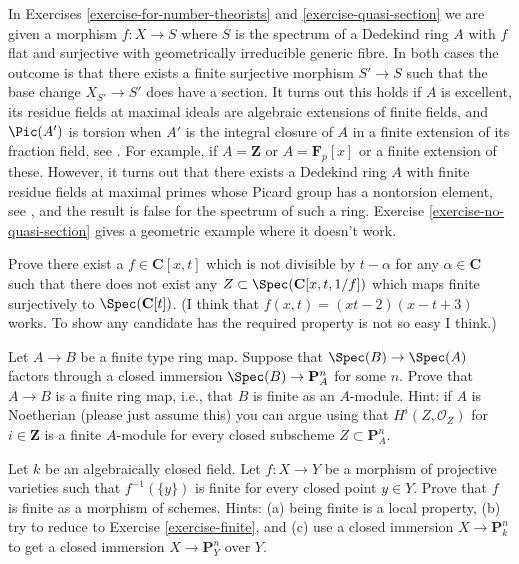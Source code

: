 \begin{remark}
\label{remark-interpretation-skolem-noether}
In Exercises \ref{exercise-for-number-theorists} and
\ref{exercise-quasi-section} we are given a morphism $f : X \to S$
where $S$ is the spectrum of a Dedekind ring $A$ with $f$ flat and
surjective with geometrically irreducible generic fibre. In both cases
the outcome is that there exists a finite surjective morphism $S' \to S$
such that the base change $X_{S'} \to S'$ does have a section.
It turns out this holds if $A$ is excellent, its residue fields
at maximal ideals are algebraic extensions of finite fields,
and $\Pic(A')$ is torsion when $A'$ is the integral closure
of $A$ in a finite extension of its fraction field, see \cite{MB1}.
For example, if $A = \mathbf{Z}$ or $A = \mathbf{F}_p[x]$ or a finite
extension of these. However, it turns
out that there exists a Dedekind ring $A$ with finite residue fields at
maximal primes whose Picard group has a nontorsion element, see \cite{Goldman},
and the result is false for the spectrum of such a ring.
Exercise \ref{exercise-no-quasi-section} gives a geometric example
where it doesn't work.
\end{remark}

\begin{exercise}
\label{exercise-no-quasi-section}
Prove there exist a $f \in \mathbf{C}[x, t]$ which is not divisible
by $t - \alpha$ for any $\alpha \in \mathbf{C}$ such that
there does not exist any $Z \subset \Spec(\mathbf{C}[x, t, 1/f])$
which maps finite surjectively to $\Spec(\mathbf{C}[t])$.
(I think that $f(x, t) = (xt - 2)(x - t + 3)$ works. To show any candidate
has the required property is not so easy I think.)
\end{exercise}

\begin{exercise}
\label{exercise-finite}
Let $A \to B$ be a finite type ring map. Suppose that
$\Spec(B) \to \Spec(A)$ factors through a closed
immersion $\Spec(B) \to \mathbf{P}^n_A$ for some $n$.
Prove that $A \to B$ is a finite ring map, i.e., that
$B$ is finite as an $A$-module.
Hint: if $A$ is Noetherian (please just assume this)
you can argue using that $H^i(Z, \mathcal{O}_Z)$ for $i \in \mathbf{Z}$
is a finite $A$-module for every closed subscheme
$Z \subset \mathbf{P}^n_A$.
\end{exercise}

\begin{exercise}
\label{exercise-projective-finite}
Let $k$ be an algebraically closed field.
Let $f : X \to Y$ be a morphism of projective
varieties such that $f^{-1}(\{y\})$ is finite for
every closed point $y \in Y$.
Prove that $f$ is finite as a morphism of schemes.
Hints: (a) being finite is a local property,
(b) try to reduce to Exercise \ref{exercise-finite}, and
(c) use a closed immersion $X \to \mathbf{P}^n_k$ to get
a closed immersion $X \to \mathbf{P}^n_Y$ over $Y$.
\end{exercise}






